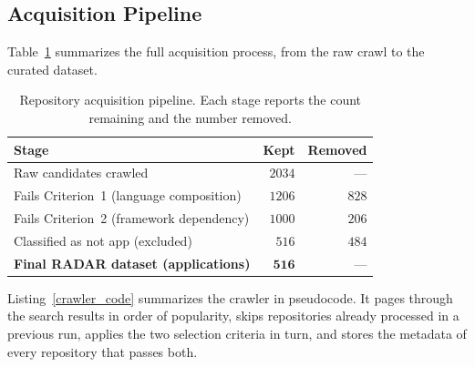 \subsection{Acquisition Pipeline}

Table~\ref{tab:pipeline} summarizes the full acquisition process, from the raw crawl to the curated dataset.
 
\begin{table}[t]
\centering
\renewcommand{\arraystretch}{1.2}
\setlength{\tabcolsep}{6pt}
\caption{Repository acquisition pipeline. Each stage reports the count
remaining and the number removed.}
\label{tab:pipeline}
\begin{tabular}{@{}>{\raggedright\arraybackslash}p{}rr@{}}
\toprule
\textbf{Stage} & \textbf{Kept} & \textbf{Removed} \\
\midrule
Raw candidates crawled                       & $2034$ & --- \\
Fails Criterion~1 (language composition)     & $1206$ & $828$ \\
Fails Criterion~2 (framework dependency)     & $1000$ & $206$ \\
Classified as not app (excluded)           & $516$ & $484$ \\
\midrule
\textbf{Final RADAR dataset (applications)}  & $\mathbf{516}$ & --- \\
\bottomrule
\end{tabular}
\end{table}

Listing~\ref{crawler_code} summarizes the crawler in pseudocode. It pages through the search results in order of popularity, skips repositories already processed in a previous run, applies the two selection criteria in turn, and stores the metadata of every repository that passes both.

